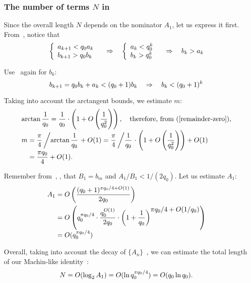 \documentclass[draft, 10pt]{article} %
\begin{document}
\subsubsection{The number of terms $N$ in~}

Since the overall length $N$ depends on the nominator $A_1$,
let us express it first.
From~, notice that
$$
\left\{ \begin{array}{l}
a_{k+1} < q_0 a_k \\
b_{k+1} > q_0 b_k
\end{array} \right.
    \quad\Rightarrow\quad
\left\{ \begin{array}{l}
a_k < q_0^k \\
b_k > q_0^k
\end{array} \right.
    \quad\Rightarrow\quad
b_k > a_k
$$

Use~ again for $b_k$:
$$
b_{k+1} = q_0 b_k + a_k < (q_0 + 1) b_k
    \quad\Rightarrow\quad b_k < (q_0 + 1)^k
$$

Taking into account the arctangent bounds, we estimate $m$:
$$
\begin{array}{l}
\arctan \dfrac{1}{q_0} = \dfrac{1}{q_0} \cdot \left( 1 + O \left(\dfrac{1}{q_0^2\strut} \right) \right),
    \quad\hbox{therefore, from~\mref{remainder-zero},} \\[1em]
m = \dfrac{\pi}{4} \left/ \arctan \dfrac{1}{q_0} \right. + O(1)
    = \dfrac{\pi}{4} \left/ \dfrac{1}{q_0} \right. \cdot
    \left( 1 + O \left( \dfrac{1}{q_0^2\strut} \right) \right) + O(1) \\[1em]
\phantom{m} = \dfrac{\pi q_0}{4} + O(1).
\end{array}
$$

Remember from~, ,
that $B_1 = b_m$ and $A_1 / B_1 < 1 / (2 q_0)$.
Let us estimate $A_1$:
$$
\begin{array}{l}
A_1 = O \left( \displaystyle\frac{(q_0+1)^{\pi q_0 / 4 + O(1)}}{2 q_0} \right) \\[1em]
\phantom{A_1} = O \left( q_0^{\pi q_0 / 4} \cdot \displaystyle\frac{q_0^{O(1)}}{2q_0} \cdot
        \left( 1+\displaystyle\frac{1}{q_0} \right)^{\displaystyle \pi q_0 / 4 + O(1/q_0)} \right) \\[1em]
\phantom{A_1} = O ( q_0^{\pi q_0 / 4} )
\end{array}
$$

Overall, taking into account the decay of $\{ A_n \}$~, we can
estimate the total length of our Machin-like identity~:
%
\begin{equation}\mlabel{estimate-length}
N = O(\log_2 A_1) = O(\ln q_0^{\pi q_0 / 4}) = O(q_0 \ln q_0).
\end{equation}
\end{document}

